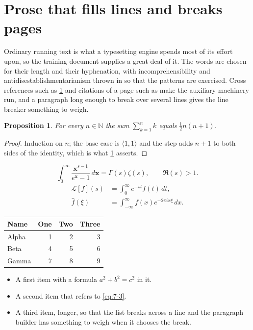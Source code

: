 \documentclass[11pt,a4paper]{report}
\theoremstyle{plain}
\newtheorem{proposition}{Proposition}[chapter]
\newcommand{\vecn}[1]{\mathbf{#1}}
\newcommand{\pairs}[2]{\langle #1,#2\rangle}
\begin{document}
\section{Prose that fills lines and breaks pages}
\label{sec:prose7-3}
Ordinary running text is what a typesetting engine spends most of its effort
upon, so the training document supplies a great deal of it. The words are
chosen for their length and their hyphenation, with incomprehensibility and
antidisestablishmentarianism thrown in so that the patterns are exercised.
Cross references such as \cref{sec:prose7-3} and citations of a page such
as \pageref{sec:prose7-3} make the auxiliary machinery run, and a
paragraph long enough to break over several lines gives the line breaker
something to weigh.
\begin{proposition}\label{prop:7-3}
For every $n\in\mathbb{N}$ the sum $\sum_{k=1}^{n}k$ equals
$\tfrac{1}{2}n(n+1)$.
\end{proposition}
\begin{proof}
Induction on $n$; the base case is $\pairs{1}{1}$ and the step adds $n+1$ to
both sides of the identity, which is what \cref{prop:7-3} asserts.
\end{proof}
\begin{equation}\label{eq:7-3}
  \int_{0}^{\infty}\frac{\vecn{x}^{s-1}}{e^{\vecn{x}}-1}\,d\vecn{x}
    = \Gamma(s)\zeta(s),\qquad \Re(s)>1 .
\end{equation}
\begin{align}
  \mathcal{L}[f](s) &= \int_{0}^{\infty} e^{-st} f(t)\,dt, \\
  \widehat{f}(\xi)  &= \int_{-\infty}^{\infty} f(x) e^{-2\pi i x\xi}\,dx .
\end{align}
\par\noindent\begin{center}
\begin{tabular}{lrrr}
\hline
Name & One & Two & Three \\
\hline
Alpha & 1 & 2 & 3 \\
Beta & 4 & 5 & 6 \\
Gamma & 7 & 8 & 9 \\
\hline
\end{tabular}
\end{center}
\begin{itemize}
  \item A first item with a formula $a^2+b^2=c^2$ in it.
  \item A second item that refers to \eqref{eq:7-3}.
  \item A third item, longer, so that the list breaks across a line and the
    paragraph builder has something to weigh when it chooses the break.
\end{itemize}
\end{document}
